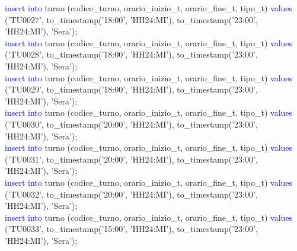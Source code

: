 \documentclass{article}
\begin{document}
\begin{flushleft}
{        \hspace*{0.5em}\textcolor{blue}{insert into} turno (codice\_turno, orario\_inizio\_t, orario\_fine\_t, tipo\_t) \textcolor{blue}{values} \hspace*{0.5em}('TU0027', to\_timestamp('18:00', 'HH24:MI'), to\_timestamp('23:00', 'HH24:MI'), \hspace*{0.5em}'Sera'); \\
        \hspace*{0.5em}\textcolor{blue}{insert into} turno (codice\_turno, orario\_inizio\_t, orario\_fine\_t, tipo\_t) \textcolor{blue}{values} \hspace*{0.5em}('TU0028', to\_timestamp('18:00', 'HH24:MI'), to\_timestamp('23:00', 'HH24:MI'), \hspace*{0.5em}'Sera'); \\
        \hspace*{0.5em}\textcolor{blue}{insert into} turno (codice\_turno, orario\_inizio\_t, orario\_fine\_t, tipo\_t) \textcolor{blue}{values} \hspace*{0.5em}('TU0029', to\_timestamp('18:00', 'HH24:MI'), to\_timestamp('23:00', 'HH24:MI'), \hspace*{0.5em}'Sera'); \\
        \hspace*{0.5em}\textcolor{blue}{insert into} turno (codice\_turno, orario\_inizio\_t, orario\_fine\_t, tipo\_t) \textcolor{blue}{values} \hspace*{0.5em}('TU0030', to\_timestamp('20:00', 'HH24:MI'), to\_timestamp('23:00', 'HH24:MI'), \hspace*{0.5em}'Sera'); \\
        \hspace*{0.5em}\textcolor{blue}{insert into} turno (codice\_turno, orario\_inizio\_t, orario\_fine\_t, tipo\_t) \textcolor{blue}{values} \hspace*{0.5em}('TU0031', to\_timestamp('20:00', 'HH24:MI'), to\_timestamp('23:00', 'HH24:MI'), \hspace*{0.5em}'Sera'); \\
        \hspace*{0.5em}\textcolor{blue}{insert into} turno (codice\_turno, orario\_inizio\_t, orario\_fine\_t, tipo\_t) \textcolor{blue}{values} \hspace*{0.5em}('TU0032', to\_timestamp('20:00', 'HH24:MI'), to\_timestamp('23:00', 'HH24:MI'), \hspace*{0.5em}'Sera'); \\
        \hspace*{0.5em}\textcolor{blue}{insert into} turno (codice\_turno, orario\_inizio\_t, orario\_fine\_t, tipo\_t) \textcolor{blue}{values} \hspace*{0.5em}('TU0033', to\_timestamp('15:00', 'HH24:MI'), to\_timestamp('23:00', 'HH24:MI'), \hspace*{0.5em}'Sera'); \\
}
\end{flushleft}
\end{document}
